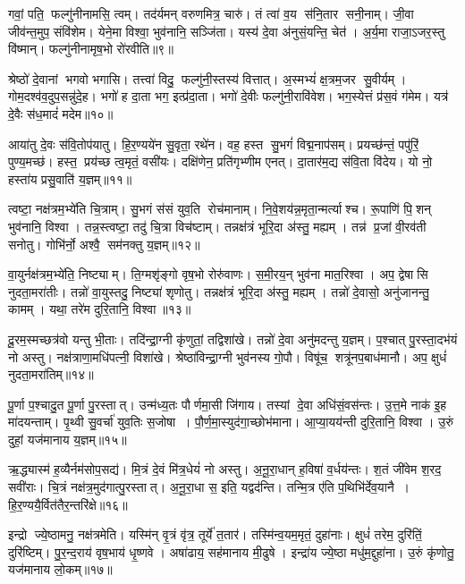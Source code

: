 गवां॒ पति॒ फल्गु॑नीनामसि॒ त्वम्। तद॑र्यमन् वरुणमित्र॒ चारु॑। तं त्वा॑ व॒य स॑नि॒तार सनी॒नाम्। जी॒वा जीव॑न्त॒मुप॒ संवि॑शेम। येने॒मा विश्वा॒ भुव॑नानि॒ सञ्जि॑ता। यस्य॑ दे॒वा अ॑नुसं॒यन्ति॒ चेत॑। अ॒र्य॒मा राजा॒ऽजर॒स्तु वि॑ष्मान्। फल्गु॑नीनामृष॒भो रो॑रवीति॥९॥ 

श्रेष्ठो॑ दे॒वानां भगवो भगासि। तत्त्वा॑ विदु॒ फल्गु॑नी॒स्तस्य॑ वित्तात्। अ॒स्मभ्यं॑ क्ष॒त्रम॒जर सु॒वीर्यम्। गोम॒दश्व॑व॒दुप॒सन्नु॑\-दे॒ह। भगो॑ ह दा॒ता भग॒ इत्प्र॑दा॒ता। भगो॑ दे॒वीः फल्गु॑नी॒रावि॑वेश। भग॒स्येत्तं प्र॑स॒वं ग॑मेम। यत्र॑ दे॒वैः स॑ध॒मादं॑ मदेम॥१०॥ 

आया॑तु दे॒वः स॑वि॒तोप॑यातु। हि॒र॒ण्यये॑न सु॒वृता॒ रथे॑न। वह॒\an{} हस्त सु॒भगं॑ विद्म॒नाप॑सम्। प्रयच्छ॑न्तं॒ पपु॑रिं॒ पुण्य॒मच्छ॑। हस्त॒ प्रय॑च्छ त्व॒मृतं॒ वसी॑यः। दक्षि॑णेन॒ प्रति॑गृभ्णीम एनत्। दा॒तार॑म॒द्य स॑वि॒ता वि॑देय। यो नो॒ हस्ता॑य प्रसु॒वाति॑ य॒ज्ञम्॥११॥ 

त्वष्टा॒ नक्ष॑त्रम॒भ्ये॑ति चि॒त्राम्। सु॒भगं स॑सं युव॒ति रोच॑मानाम्। नि॒वे॒शय॑न्न॒\-मृता॒न्मर्त्याश्च। रू॒पाणि॑ पि॒शन् भुव॑नानि॒ विश्वा। तन्न॒स्त्वष्टा॒ तदु॑ चि॒त्रा विच॑ष्टाम्। तन्नक्ष॑त्रं भूरि॒दा अ॑स्तु॒ मह्यम्। तन्न॑ प्र॒जां वी॒रव॑ती सनोतु। गोभि॑र्नो॒ अश्वै॒ सम॑नक्तु य॒ज्ञम्॥१२॥ 

वा॒युर्नक्ष॑त्रम॒भ्ये॑ति॒ निष्ट्याम्। ति॒ग्मशृ॑ङ्गो वृष॒भो रोरु॑वाणः। स॒मी॒रय॒न् भुव॑ना मात॒रिश्वा। अप॒ द्वेषासि नुदता॒मरा॑तीः। तन्नो॑ वा॒युस्तदु॒ निष्ट्या॑ शृणोतु। तन्नक्ष॑त्रं भूरि॒दा अ॑स्तु॒ मह्यम्। तन्नो॑ दे॒वासो॒ अनु॑जानन्तु॒ कामम्। यथा॒ तरे॑म दुरि॒तानि॒ विश्वा॥१३॥ 

दू॒रम॒स्मच्छत्र॑वो यन्तु भी॒ताः। तदि॑न्द्रा॒ग्नी कृ॑णुतां॒ तद्विशा॑खे। तन्नो॑ दे॒वा अनु॑मदन्तु य॒ज्ञम्। प॒श्चात् पु॒रस्ता॒दभ॑यं नो अस्तु। नक्ष॑त्राणा॒मधि॑पत्नी॒ विशा॑खे। श्रेष्ठा॑विन्द्रा॒ग्नी भुव॑नस्य गो॒पौ। विषू॑च॒ शत्रू॑नप॒बाध॑मानौ। अप॒ क्षुधं॑ नुदता॒मरा॑तिम्॥१४॥ 

पू॒र्णा प॒श्चादु॒त पू॒र्णा पु॒रस्तात्। उन्म॑ध्य॒तः पौर्णमा॒सी जि॑गाय। तस्यां दे॒वा अधि॑सं॒वस॑न्तः। उ॒त्त॒मे नाक॑ इ॒ह मा॑दयन्ताम्। पृ॒थ्वी सु॒वर्चा॑ युव॒तिः स॒जोषा। पौ॒र्ण॒मा॒स्युद॑गा॒च्छोभ॑माना। आ॒प्या॒यय॑न्ती दुरि॒तानि॒ विश्वा। उ॒रुं दुहां॒ यज॑मानाय य॒ज्ञम्॥१५॥ 

ऋ॒द्ध्यास्म॑ ह॒व्यैर्नम॑सोप॒सद्य॑। मि॒त्रं दे॒वं मि॑त्र॒धेयं॑ नो अस्तु। अ॒नू॒रा॒धान् ह॒विषा॑ व॒र्धय॑न्तः। श॒तं जी॑वेम श॒रद॒ सवी॑राः। चि॒त्रं नक्ष॑त्र॒मुद॑गात्पु॒रस्तात्। अ॒नू॒रा॒धा स॒ इति॒ यद्वद॑न्ति। तन्मि॒त्र ए॑ति प॒थिभि॑र्देव॒यानै। हि॒र॒ण्ययै॒र्वित॑तै\-र॒न्तरि॑क्षे॥१६॥ 

इन्द्रो ज्ये॒ष्ठामनु॒ नक्ष॑त्रमेति। यस्मि॑न् वृ॒त्रं वृ॑त्र॒ तूर्ये॑ त॒तार॑। तस्मि॑न्व॒यम॒मृतं॒ दुहा॑नाः। क्षुधं॑ तरेम॒ दुरि॑तिं॒ दुरि॑ष्टिम्। पु॒र॒न्द॒राय॑ वृष॒भाय॑ धृ॒ष्णवे। अषा॑ढाय॒ सह॑मानाय मी॒ढुषे। इन्द्रा॑य ज्ये॒ष्ठा मधु॑म॒द्दुहा॑ना। उ॒रुं कृ॑णोतु॒ यज॑मानाय लो॒कम्॥१७॥ 

